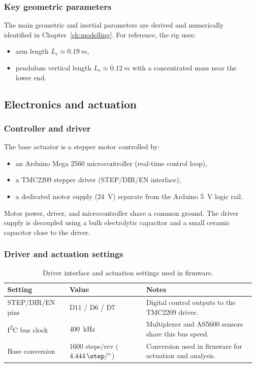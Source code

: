 \subsubsection*{Key geometric parameters}
The main geometric and inertial parameters are derived and numerically identified in Chapter~\ref{ch:modelling}. For reference, the rig uses:
\begin{itemize}
  \item arm length $L_r \approx \SI{0.19}{m}$,
  \item pendulum vertical length $L_v \approx \SI{0.12}{m}$ with a concentrated mass near the lower end.
\end{itemize}

\subsection{Electronics and actuation}
\label{sec:electronics_actuation}
\subsubsection*{Controller and driver}
The base actuator is a stepper motor controlled by:
\begin{itemize}
  \item an Arduino Mega 2560 microcontroller (real-time control loop),
  \item a TMC2209 stepper driver (STEP/DIR/EN interface),
  \item a dedicated motor supply (\SI{24}{V}) separate from the Arduino \SI{5}{V} logic rail.
\end{itemize}
Motor power, driver, and microcontroller share a common ground. The driver supply is decoupled using a bulk electrolytic capacitor and a small ceramic capacitor close to the driver.

\subsubsection*{Driver and actuation settings}
\begin{table}[htbp]
  \centering
  \small
  \setlength{\tabcolsep}{6pt}
  \caption{Driver interface and actuation settings used in firmware.}
  \label{tab:driver_actuation_settings}
  \begin{tabularx}{\linewidth}{@{}l l X@{}}
    \toprule
    Setting & Value & Notes \\
    \midrule
    STEP/DIR/EN pins & D11 / D6 / D7 & Digital control outputs to the TMC2209 driver. \\
    I\textsuperscript{2}C bus clock & \SI{400}{kHz} & Multiplexer and AS5600 sensors share this bus speed. \\
    Base conversion & $1600$ steps/rev ($\SI{4.444}{\step\per\degree}$) & Conversion used in firmware for actuation and analysis. \\
    \bottomrule
  \end{tabularx}
\end{table}


